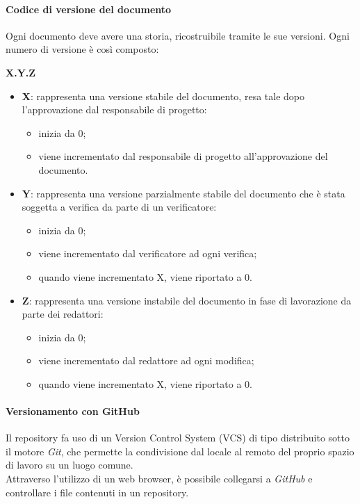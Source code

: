 			\paragraph{Codice di versione del documento}
			Ogni documento deve avere una storia, ricostruibile tramite le sue versioni. Ogni numero di versione è così composto:\\
			\centerline{\textbf{X.Y.Z}}
			\begin{itemize}
			\item \textbf{X}: rappresenta una versione stabile del documento, resa tale dopo l'approvazione dal responsabile di progetto:
				\begin{itemize}
		   			\item inizia da 0;
		   			\item viene incrementato dal responsabile di progetto all'approvazione del documento.
		  		\end{itemize}
		  	\item \textbf{Y}: rappresenta una versione parzialmente stabile del documento che è stata soggetta a verifica da parte di un verificatore:
		  		\begin{itemize}
		   			\item inizia da 0;
		   			\item viene incrementato dal verificatore ad ogni verifica; 
		   			\item quando viene incrementato X, viene riportato a 0.
		   		\end{itemize}
		   	\item \textbf{Z}: rappresenta una versione instabile del documento in fase di lavorazione da parte dei redattori:
		   		\begin{itemize}
		   			\item inizia da 0;
		   			\item viene incrementato dal redattore ad ogni modifica; 
		   			\item quando viene incrementato X, viene riportato a 0.
		   		\end{itemize}
			\end{itemize}
			
			\paragraph{Versionamento con GitHub}
	Il repository fa uso di un Version Control System (VCS) di tipo distribuito sotto il motore \textit{Git}, che permette la condivisione dal locale al remoto del proprio spazio di lavoro su un luogo comune.\\
		Attraverso l'utilizzo di un web browser, è possibile collegarsi a \textit{GitHub} e controllare i file contenuti in un repository. 
